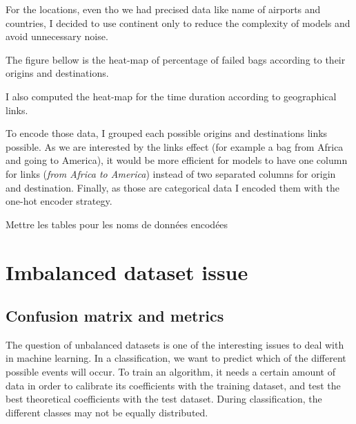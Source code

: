 \documentclass[12pt]{article}
\begin{document}
\noindent For the locations, even tho we had precised data like name of airports and countries, I decided to use continent only to reduce the complexity of models and avoid unnecessary noise. 

\noindent The figure bellow is the heat-map of percentage of failed bags according to their origins and destinations.

\noindent I also computed the heat-map for the time duration according to geographical links.


\noindent To encode those data, I grouped each possible origins and destinations links possible. As we are interested by the links effect (for example a bag from Africa and going to America), it would be more efficient for models to have one column for links (\textit{from Africa to America}) instead of two separated columns for origin and destination. Finally, as those are categorical data I encoded them with the one-hot encoder strategy.

Mettre les tables pour les noms de données encodées




\newpage
\section{Imbalanced dataset issue}\label{section:Imbalanced dataset issue}

\subsection{Confusion matrix and metrics}

The question of unbalanced datasets is one of the interesting issues to deal with in machine learning. In a classification, we want to predict which of the different possible events will occur. To train an algorithm, it needs a certain amount of data in order to calibrate its coefficients with the training dataset, and test the best theoretical coefficients with the test dataset. During classification, the different classes may not be equally distributed. 
\cite{ArtificialIntelligenceReview}
\end{document}

